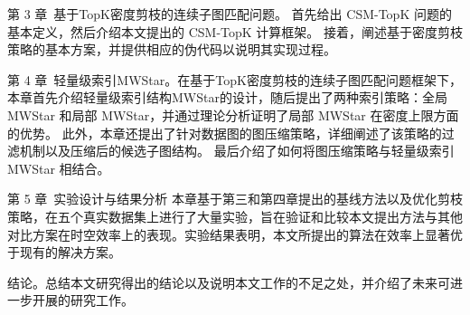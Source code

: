 第 3 章\ 基于TopK密度剪枝的连续子图匹配问题。
首先给出 CSM-TopK 问题的基本定义，然后介绍本文提出的 CSM-TopK 计算框架。
接着，阐述基于密度剪枝策略的基本方案，并提供相应的伪代码以说明其实现过程。

第 4 章\ 轻量级索引MWStar。在基于TopK密度剪枝的连续子图匹配问题框架下，本章首先介绍轻量级索引结构MWStar的设计，随后提出了两种索引策略：全局 MWStar 和局部 MWStar，并通过理论分析证明了局部 MWStar 在密度上限方面的优势。
此外，本章还提出了针对数据图的图压缩策略，详细阐述了该策略的过滤机制以及压缩后的候选子图结构。
最后介绍了如何将图压缩策略与轻量级索引 MWStar 相结合。

第 5 章\ 实验设计与结果分析
本章基于第三和第四章提出的基线方法以及优化剪枝策略，在五个真实数据集上进行了大量实验，旨在验证和比较本文提出方法与其他对比方案在时空效率上的表现。实验结果表明，本文所提出的算法在效率上显著优于现有的解决方案。

结论。总结本文研究得出的结论以及说明本文工作的不足之处，并介绍了未来可进一步开展的研究工作。
